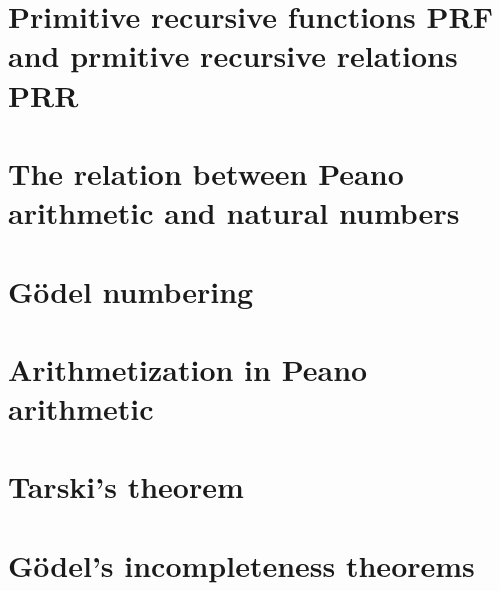 \documentclass[11pt,a4paper]{article}
\begin{document}
\section{Primitive recursive functions PRF and prmitive recursive relations PRR}

\section{The relation between Peano arithmetic and natural numbers}

\section{Gödel numbering}

\section{Arithmetization in Peano arithmetic}

\section{Tarski's theorem}

\section{Gödel's incompleteness theorems}
\end{document}
